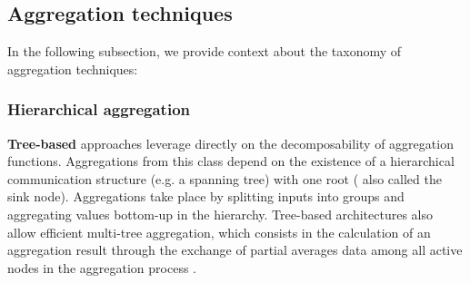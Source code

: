 \begin{table}[]
    \centering
    \caption{Decomposability and duplicate sensitiveness of aggregation functions}
    \label{table:aggregation_functions}
\end{table}



\subsection{Aggregation techniques}

In the following subsection, we provide context about the taxonomy of aggregation techniques:

\subsubsection*{Hierarchical aggregation}

\textbf{Tree-based} approaches leverage directly on the decomposability of aggregation functions. Aggregations from this class depend on the existence of a hierarchical communication structure (e.g. a spanning tree) with one root ( also called the sink node). Aggregations take place by splitting inputs into groups and aggregating values bottom-up in the hierarchy.  Tree-based architectures also allow efficient multi-tree aggregation, which consists in the calculation of an aggregation result through the exchange of partial averages data among all active nodes in the aggregation process \cite{akosThesis}. 

